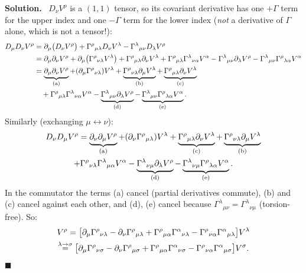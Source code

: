 \documentclass[11pt,a4paper]{article}
\numberwithin{equation}{subsection}
\newenvironment{solution}{\par\noindent\textbf{\textcolor{excol!70!black}{Solution.}}\ }{\hfill$\blacksquare$\par\medskip}
\begin{document}
\begin{solution}
$D_\nu V^\rho$ is a $(1,1)$ tensor, so its covariant derivative has one $+\Gamma$ term for the upper index and one $-\Gamma$ term for the lower index (\emph{not} a derivative of $\Gamma$ alone, which is not a tensor!):
\begin{align*}
  D_\mu D_\nu V^\rho&=\partial_\mu\big(D_\nu V^\rho\big)+\Gamma^\rho{}_{\mu\lambda}D_\nu V^\lambda-\Gamma^\lambda{}_{\mu\nu}D_\lambda V^\rho\\
  &=\partial_\mu\partial_\nu V^\rho+\partial_\mu\big(\Gamma^\rho{}_{\nu\lambda}V^\lambda\big)+\Gamma^\rho{}_{\mu\lambda}\partial_\nu V^\lambda+\Gamma^\rho{}_{\mu\lambda}\Gamma^\lambda{}_{\nu\alpha}V^\alpha-\Gamma^\lambda{}_{\mu\nu}\partial_\lambda V^\rho-\Gamma^\lambda{}_{\mu\nu}\Gamma^\rho{}_{\lambda\alpha}V^\alpha\\
  &=\underbrace{\partial_\mu\partial_\nu V^\rho}_{\rm (a)}+(\partial_\mu\Gamma^\rho{}_{\nu\lambda})V^\lambda+\underbrace{\Gamma^\rho{}_{\nu\lambda}\partial_\mu V^\lambda}_{\rm (b)}+\underbrace{\Gamma^\rho{}_{\mu\lambda}\partial_\nu V^\lambda}_{\rm (c)}\\ &\quad
  +\Gamma^\rho{}_{\mu\lambda}\Gamma^\lambda{}_{\nu\alpha}V^\alpha-\underbrace{\Gamma^\lambda{}_{\mu\nu}\partial_\lambda V^\rho}_{\rm (d)}-\underbrace{\Gamma^\lambda{}_{\mu\nu}\Gamma^\rho{}_{\lambda\alpha}V^\alpha}_{\rm (e)} .
\end{align*}
Similarly (exchanging $\mu\leftrightarrow\nu$):
\begin{gather*}
  D_\nu D_\mu V^\rho=\underbrace{\partial_\nu\partial_\mu V^\rho}_{\rm (a)}+(\partial_\nu\Gamma^\rho{}_{\mu\lambda})V^\lambda+\underbrace{\Gamma^\rho{}_{\mu\lambda}\partial_\nu V^\lambda}_{\rm (c)}+\underbrace{\Gamma^\rho{}_{\nu\lambda}\partial_\mu V^\lambda}_{\rm (b)}\\
  +\Gamma^\rho{}_{\nu\lambda}\Gamma^\lambda{}_{\mu\alpha}V^\alpha-\underbrace{\Gamma^\lambda{}_{\nu\mu}\partial_\lambda V^\rho}_{\rm (d)}-\underbrace{\Gamma^\lambda{}_{\nu\mu}\Gamma^\rho{}_{\lambda\alpha}V^\alpha}_{\rm (e)} .
\end{gather*}
In the commutator the terms (a) cancel (partial derivatives commute), (b) and (c) cancel against each other, and (d), (e) cancel because $\Gamma^\lambda{}_{\mu\nu}=\Gamma^\lambda{}_{\nu\mu}$ (torsion-free). So:
\begin{gather*}
  [D_\mu,D_\nu]V^\rho=\big[\pd_\mu\Gamma^\rho{}_{\nu\lambda}-\pd_\nu\Gamma^\rho{}_{\mu\lambda}+\Gamma^\rho{}_{\mu\alpha}\Gamma^\alpha{}_{\nu\lambda}-\Gamma^\rho{}_{\nu\alpha}\Gamma^\alpha{}_{\mu\lambda}\big]V^\lambda\\
  \overset{\lambda\to\sigma}{=}\big[\pd_\mu\Gamma^\rho{}_{\nu\sigma}-\pd_\nu\Gamma^\rho{}_{\mu\sigma}+\Gamma^\rho{}_{\mu\alpha}\Gamma^\alpha{}_{\nu\sigma}-\Gamma^\rho{}_{\nu\alpha}\Gamma^\alpha{}_{\mu\sigma}\big]V^\sigma .

\end{gather*}
\end{solution}
\end{document}
